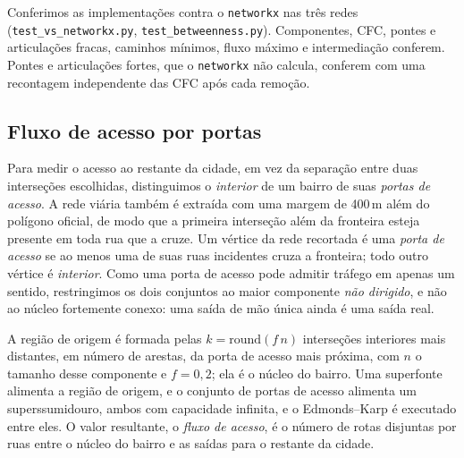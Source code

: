 Conferimos as implementações contra o \texttt{networkx} nas três redes
(\texttt{test\_vs\_networkx.py}, \texttt{test\_betweenness.py}).
Componentes, CFC, pontes e articulações fracas, caminhos mínimos, fluxo
máximo e intermediação conferem. Pontes e articulações fortes, que o
\texttt{networkx} não calcula, conferem com uma recontagem independente
das CFC após cada remoção.

\subsection{Fluxo de acesso por portas}
\label{sec:access-flow}

Para medir o acesso ao restante da cidade, em vez da separação entre
duas interseções escolhidas, distinguimos o \emph{interior} de um bairro
de suas \emph{portas de acesso}. A rede viária também é extraída com uma
margem de 400\,m além do polígono oficial, de modo que a primeira
interseção além da fronteira esteja presente em toda rua que a cruze.
Um vértice da rede recortada é uma \emph{porta de acesso} se ao menos
uma de suas ruas incidentes cruza a fronteira; todo outro vértice é
\emph{interior}. Como uma porta de acesso pode admitir tráfego em apenas
um sentido, restringimos os dois conjuntos ao maior componente
\emph{não dirigido}, e não ao núcleo fortemente conexo: uma saída de mão
única ainda é uma saída real.

A região de origem é formada pelas $k=\mathrm{round}(f\,n)$ interseções
interiores mais distantes, em número de arestas, da porta de acesso mais
próxima, com $n$ o tamanho desse componente e $f=0{,}2$; ela é o núcleo
do bairro. Uma superfonte alimenta a região de origem, e o conjunto de
portas de acesso alimenta um superssumidouro, ambos com capacidade
infinita, e o Edmonds--Karp é executado entre eles. O valor resultante,
o \emph{fluxo de acesso}, é o número de rotas disjuntas por ruas entre o
núcleo do bairro e as saídas para o restante da cidade.

